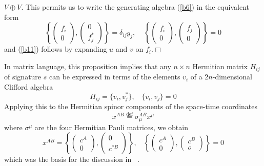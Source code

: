 \documentclass[a4paper,a4paper]{article}
\begin{document}
$V\oplus V$. This permits us to write the generating algebra (\ref{b6}) in the
equivalent form 
\begin{equation} 
\left \{ \left( \begin{array}{c}f_{i}\\0 \end{array} \right),\left(
\begin{array}{c}0\\f_{j}^{\ast } \end{array} \right) \right \}=\delta
_{ij}g_{j}, \ \ \ \ \  \left \{ \left( \begin{array}{c}f_{i}\\0 \end{array}
\right),\left(
\begin{array}{c}f_{j}\\0 \end{array} \right) \right \}=0
\label{b7}
\end{equation}
and (\ref{b11}) follows by expanding $u$ and $v$ on $f_{i}$.$\Box$

In matrix language, this proposition implies that any $n\times n$ Hermitian
matrix $H_{ij}$ of signature $s$ can be expressed in terms of the elements
$v_{i}$ of a $2n$-dimensional Clifford algebra
\begin{equation} 
H_{ij}=\{v_{i},v_{j}^{\ast }\}, \ \ \ \ \{v_{i},v_{j}\}=0
\label{b8}
\end{equation}
Applying this to the Hermitian spinor components of the space-time coordinates 
\begin{equation} 
x^{A\dot{B}} \stackrel{\mathrm{def}}{=} \sigma _{\mu}^{A\dot{B}}x^{\mu}
\label{b9}
\end{equation}
where $\sigma^{\mu} $ are the four Hermitian Pauli matrices, we obtain
\begin{equation} 
x^{A \dot{B}}= \left \{ \left( \begin{array}{c}c^{A}\\0 \end{array}
\right),\left( \begin{array}{c}0\\c^{\ast \dot{B} } \end{array} \right) \right
\}, \ \ \ \  \left \{ \left( \begin{array}{c}c^{A}\\0 \end{array} \right),\left(
\begin{array}{c}c^{B}\\o \end{array} \right) \right \}=0 
\label{b10}
\end{equation}
which was the basis for the discussion in ~\cite{borch4}.
\end{document}
